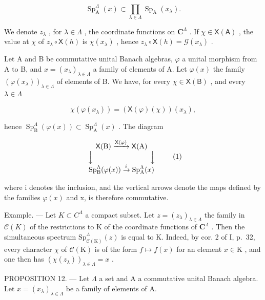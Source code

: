 \[
\operatorname{Sp} _ {\mathrm{A}} ^ {\Lambda} (x) \subset \prod_ {\lambda \in \Lambda} \operatorname{Sp} _ {\mathrm{A}} (x _ {\lambda}).
\]

We denote \(z_{\lambda}\) , for \(\lambda \in \Lambda\) , the coordinate functions on \(\mathbf{C}^{\Lambda}\) . If \(\chi \in \mathsf{X}(\mathsf{A})\) , the value at \(\chi\) of \(z_{\lambda} \circ \mathsf{X}(h)\) is \(\chi(x_{\lambda})\) , hence \(z_{\lambda} \circ \mathsf{X}(h) = \mathcal{G}(x_{\lambda})\) .

Let A and B be commutative unital Banach algebras, \(\varphi\) a unital morphism from A to B, and \(x = (x_{\lambda})_{\lambda \in \Lambda}\) a family of elements of A. Let \(\varphi(x)\) the family \((\varphi(x_{\lambda}))_{\lambda \in \Lambda}\) of elements of B. We have, for every \(\chi \in \mathsf{X}(\mathsf{B})\) , and every \(\lambda \in \Lambda\)

\[
\chi (\varphi (x _ {\lambda})) = (\mathsf {X} (\varphi) (\chi)) (x _ {\lambda}),
\]

hence \(\operatorname{Sp}_{\mathrm{B}}^{\Lambda}(\varphi(x)) \subset \operatorname{Sp}_{\mathrm{A}}^{\Lambda}(x)\) . The diagram

\[
\begin{array}{c} \mathsf {X} (\mathrm{B}) \xrightarrow {\mathsf {X} (\varphi)} \mathsf {X} (\mathrm{A}) \\ \Big \downarrow \qquad \qquad \qquad \qquad \Big \downarrow \\ \operatorname{Sp} _ {\mathrm{B}} ^ {\Lambda} (\varphi (x)) \xrightarrow {i} \operatorname{Sp} _ {\mathrm{A}} ^ {\Lambda} (x) \end{array}\tag{1}
\]

where i denotes the inclusion, and the vertical arrows denote the maps defined by the families \(\varphi(x)\) and x, is therefore commutative.

Example. --- Let \(K \subset C^{\Lambda}\) a compact subset. Let \(z = (z_{\lambda})_{\lambda \in \Lambda}\) the family in \(\mathcal{C}(K)\) of the restrictions to K of the coordinate functions of \(\mathbf{C}^{\Lambda}\) . Then the simultaneous spectrum \(\mathrm{Sp}_{\mathcal{C}(\mathrm{K})}^{\Lambda}(z)\) is equal to K. Indeed, by cor. 2 of I, p.~32, every character \(\chi\) of \(\mathcal{C}(\mathrm{K})\) is of the form \(f \mapsto f(x)\) for an element \(x \in \mathrm{K}\) , and one then has \((\chi(z_{\lambda}))_{\lambda \in \Lambda} = x\) .

PROPOSITION 12. — Let \(\Lambda\) a set and A a commutative unital Banach algebra. Let \(x = (x_{\lambda})_{\lambda \in \Lambda}\) be a family of elements of A.

